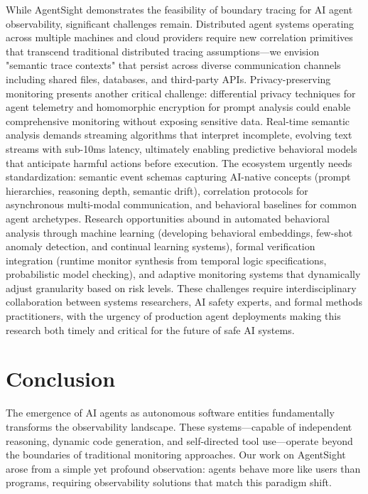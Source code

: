 \documentclass[sigplan,screen，review,9pt]{acmart}
\begin{document}
While AgentSight demonstrates the feasibility of boundary tracing for AI agent observability, significant challenges remain. Distributed agent systems operating across multiple machines and cloud providers require new correlation primitives that transcend traditional distributed tracing assumptions—we envision "semantic trace contexts" that persist across diverse communication channels including shared files, databases, and third-party APIs. Privacy-preserving monitoring presents another critical challenge: differential privacy techniques for agent telemetry and homomorphic encryption for prompt analysis could enable comprehensive monitoring without exposing sensitive data. Real-time semantic analysis demands streaming algorithms that interpret incomplete, evolving text streams with sub-10ms latency, ultimately enabling predictive behavioral models that anticipate harmful actions before execution. The ecosystem urgently needs standardization: semantic event schemas capturing AI-native concepts (prompt hierarchies, reasoning depth, semantic drift), correlation protocols for asynchronous multi-modal communication, and behavioral baselines for common agent archetypes. Research opportunities abound in automated behavioral analysis through machine learning (developing behavioral embeddings, few-shot anomaly detection, and continual learning systems), formal verification integration (runtime monitor synthesis from temporal logic specifications, probabilistic model checking), and adaptive monitoring systems that dynamically adjust granularity based on risk levels. These challenges require interdisciplinary collaboration between systems researchers, AI safety experts, and formal methods practitioners, with the urgency of production agent deployments making this research both timely and critical for the future of safe AI systems.


\section{Conclusion}

The emergence of AI agents as autonomous software entities fundamentally transforms the observability landscape. These systems—capable of independent reasoning, dynamic code generation, and self-directed tool use—operate beyond the boundaries of traditional monitoring approaches. Our work on AgentSight arose from a simple yet profound observation: agents behave more like users than programs, requiring observability solutions that match this paradigm shift.
\end{document}
